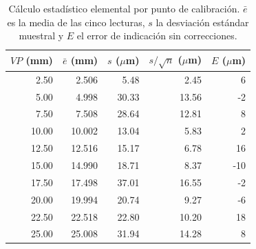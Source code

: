 \begin{table}[H]
\centering
\caption{Cálculo estadístico elemental por punto de calibración. $\bar e$ es la media de las cinco lecturas, $s$ la desviación estándar muestral y $E$ el error de indicación sin correcciones.}
\label{tab:ut-estadistica}
\begin{tabular}{rrrrr}
\toprule
$VP$ (mm) & $\bar e$ (mm) & $s$ ($\mu$m) & $s/\sqrt{n}$ ($\mu$m) & $E$ ($\mu$m) \\
\midrule
2.50 & 2.506 & 5.48 & 2.45 & 6 \\
5.00 & 4.998 & 30.33 & 13.56 & -2 \\
7.50 & 7.508 & 28.64 & 12.81 & 8 \\
10.00 & 10.002 & 13.04 & 5.83 & 2 \\
12.50 & 12.516 & 15.17 & 6.78 & 16 \\
15.00 & 14.990 & 18.71 & 8.37 & -10 \\
17.50 & 17.498 & 37.01 & 16.55 & -2 \\
20.00 & 19.994 & 20.74 & 9.27 & -6 \\
22.50 & 22.518 & 22.80 & 10.20 & 18 \\
25.00 & 25.008 & 31.94 & 14.28 & 8 \\
\bottomrule
\end{tabular}
\end{table}
